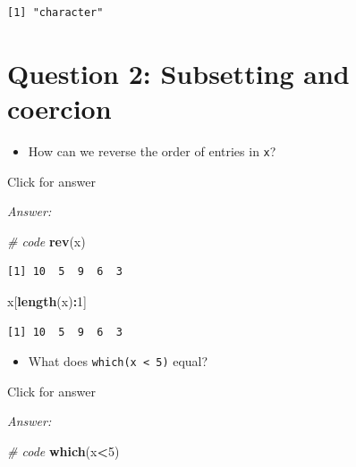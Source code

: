 \documentclass[
]{book}
\newenvironment{Shaded}{\begin{snugshade}}{\end{snugshade}}
\newcommand{\CommentTok}[1]{\textcolor[rgb]{0.56,0.35,0.01}{\textit{#1}}}
\newcommand{\DecValTok}[1]{\textcolor[rgb]{0.00,0.00,0.81}{#1}}
\newcommand{\FunctionTok}[1]{\textcolor[rgb]{0.13,0.29,0.53}{\textbf{#1}}}
\newcommand{\NormalTok}[1]{#1}
\newcommand{\SpecialCharTok}[1]{\textcolor[rgb]{0.81,0.36,0.00}{\textbf{#1}}}
\providecommand{\tightlist}{%
  \setlength{\itemsep}{0pt}\setlength{\parskip}{0pt}}
\begin{document}
\begin{verbatim}
[1] "character"
\end{verbatim}

\hypertarget{question-2-subsetting-and-coercion}{%
\section{Question 2: Subsetting and coercion}\label{question-2-subsetting-and-coercion}}

\begin{itemize}
\tightlist
\item
  How can we reverse the order of entries in \texttt{x}?
\end{itemize}

Click for answer

\emph{Answer:}

\begin{Shaded}
\begin{Highlighting}[]
\CommentTok{\# code}
\FunctionTok{rev}\NormalTok{(x)}
\end{Highlighting}
\end{Shaded}

\begin{verbatim}
[1] 10  5  9  6  3
\end{verbatim}

\begin{Shaded}
\begin{Highlighting}[]
\NormalTok{x[}\FunctionTok{length}\NormalTok{(x)}\SpecialCharTok{:}\DecValTok{1}\NormalTok{]}
\end{Highlighting}
\end{Shaded}

\begin{verbatim}
[1] 10  5  9  6  3
\end{verbatim}

\begin{itemize}
\tightlist
\item
  What does \texttt{which(x\ \textless{}\ 5)} equal?
\end{itemize}

Click for answer

\emph{Answer:}

\begin{Shaded}
\begin{Highlighting}[]
\CommentTok{\# code}
\FunctionTok{which}\NormalTok{(x}\SpecialCharTok{\textless{}}\DecValTok{5}\NormalTok{)}
\end{Highlighting}
\end{Shaded}
\end{document}
